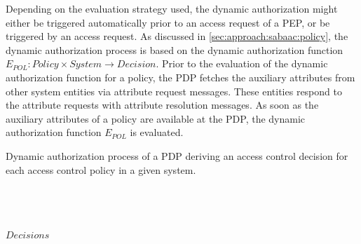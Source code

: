\begin{description}
    Depending on the evaluation strategy used, the dynamic authorization might either be triggered automatically prior to an access request of a PEP, or be triggered by an access request.
    As discussed in \autoref{sec:approach:sabaac:policy}, the dynamic authorization process is based on the dynamic authorization function $E_{POL}: Policy \times System \rightarrow Decision$.
    Prior to the evaluation of the dynamic authorization function for a policy, the PDP fetches the auxiliary attributes from other system entities via attribute request messages.
    These entities respond to the attribute requests with attribute resolution messages.
    As soon as the auxiliary attributes of a policy are available at the PDP, the dynamic authorization function $E_{POL}$ is evaluated.
    \begin{algorithm}
        \caption{Dynamic authorization process of a PDP deriving an access control decision for each access control policy in a given system.}
        \label{alg:dynamic_authorization}
        \begin{algorithmic}
             
             
            \\
                 
                \EndFor
                \\
                \\
            \EndFor
            \State \Return $Decisions$
        \EndFunction
        \end{algorithmic}

\end{algorithm}
\end{description}
